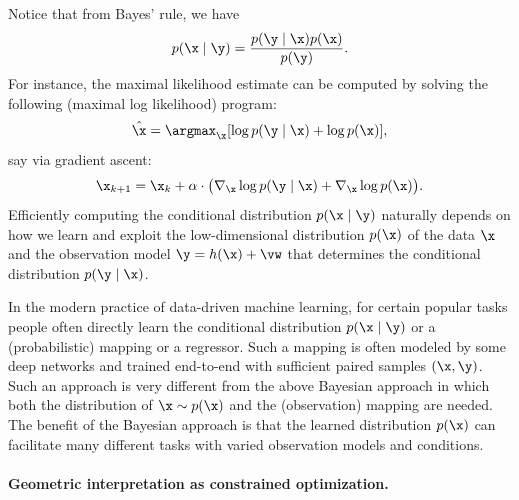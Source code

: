 \documentclass[../../book-main.tex]{subfiles}
\begin{document}
Notice that from Bayes' rule, we have
\begin{equation}
  p(\x\mid \y) = \frac{p(\y\mid \x) p(\x) }{p(\y)}.
\end{equation} 
For instance, the maximal likelihood estimate can be computed by solving the following (maximal log likelihood) program:
\begin{equation}
    \hat{\x} = \argmax_{\x} [\log p(\y\mid \x) + \log p(\x)], 
\end{equation}
say via gradient ascent:
\begin{equation}
    \x_{k+1} = \x_k + \alpha \cdot \big(\nabla_{\x} \log p(\y \mid \x) + \nabla_{\x} \log p(\x)\big).
    \label{eqn:loglikelihoo-gradient-ascent}
\end{equation}
Efficiently computing the conditional distribution $p(\x \mid \y)$ naturally depends on how we learn and exploit the low-dimensional distribution $p(\x)$ of the data $\x$ and the observation model $\y = h(\x) + \vw$ that determines the conditional distribution $p(\y \mid \x)$. 

\begin{remark}
In the modern practice of data-driven machine learning, for certain popular tasks people often directly learn the conditional distribution $p(\x\mid \y)$ or a (probabilistic) mapping or a regressor. Such a mapping is often modeled by some deep networks and trained end-to-end with sufficient paired samples $(\x, \y)$. Such an approach is very different from the above Bayesian approach in which both the distribution of $\x \sim p(\x)$ and the (observation) mapping are needed. The benefit of the Bayesian approach is that the learned distribution $p(\x)$ can facilitate many different tasks with varied observation models and conditions. 
\end{remark}

\paragraph{Geometric interpretation as constrained optimization.}
\end{document}
